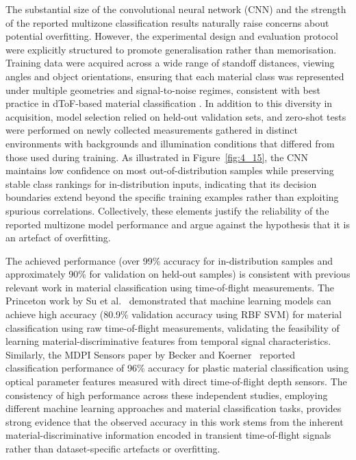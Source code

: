 \documentclass[12pt,a4paper,oneside]{report}
\begin{document}
\noindent The substantial size of the convolutional neural network (CNN) and the strength of the reported multizone classification results naturally raise concerns about potential overfitting. However, the experimental design and evaluation protocol were explicitly structured to promote generalisation rather than memorisation. Training data were acquired across a wide range of standoff distances, viewing angles and object orientations, ensuring that each material class was represented under multiple geometries and signal-to-noise regimes, consistent with best practice in dToF-based material classification \cite{becker2023,su2016}. In addition to this diversity in acquisition, model selection relied on held-out validation sets, and zero-shot tests were performed on newly collected measurements gathered in distinct environments with backgrounds and illumination conditions that differed from those used during training. As illustrated in Figure~\ref{fig:4_15}, the CNN maintains low confidence on most out-of-distribution samples while preserving stable class rankings for in-distribution inputs, indicating that its decision boundaries extend beyond the specific training examples rather than exploiting spurious correlations. Collectively, these elements justify the reliability of the reported multizone model performance and argue against the hypothesis that it is an artefact of overfitting.

The achieved performance (over 99\% accuracy for in-distribution samples and approximately 90\% for validation on held-out samples) is consistent with previous relevant work in material classification using time-of-flight measurements. The Princeton work by Su et al.~\cite{su2016} demonstrated that machine learning models can achieve high accuracy (80.9\% validation accuracy using RBF SVM) for material classification using raw time-of-flight measurements, validating the feasibility of learning material-discriminative features from temporal signal characteristics. Similarly, the MDPI Sensors paper by Becker and Koerner~\cite{becker2023} reported classification performance of 96\% accuracy for plastic material classification using optical parameter features measured with direct time-of-flight depth sensors. The consistency of high performance across these independent studies, employing different machine learning approaches and material classification tasks, provides strong evidence that the observed accuracy in this work stems from the inherent material-discriminative information encoded in transient time-of-flight signals rather than dataset-specific artefacts or overfitting.
\end{document}
